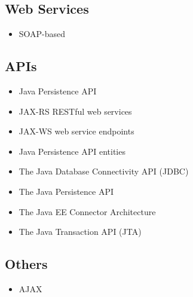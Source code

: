 \subsection{Web Services}
\begin{itemize}
	\item SOAP-based
\end{itemize} 


\subsection{APIs}
\begin{itemize}
	\item Java Persistence API
\end{itemize}

\begin{itemize}
	\item JAX-RS RESTful web services
\end{itemize}

\begin{itemize}
	\item JAX-WS web service endpoints
\end{itemize}

\begin{itemize}
	\item Java Persistence API entities
\end{itemize}

\begin{itemize}
	\item The Java Database Connectivity API (JDBC)
\end{itemize}

\begin{itemize}
	\item The Java Persistence API
\end{itemize}

\begin{itemize}
	\item The Java EE Connector Architecture
\end{itemize}

\begin{itemize}
	\item The Java Transaction API (JTA)
\end{itemize}


\subsection{Others}
\begin{itemize}
	\item AJAX
\end{itemize}

